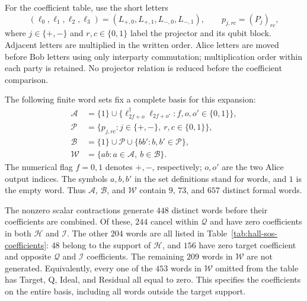 For the coefficient table, use the short letters
\begin{equation*}
 (\ell_0,\ell_1,\ell_2,\ell_3)
 =(L_{+,0},L_{+,1},L_{-,0},L_{-,1}),
 \qquad p_{j,rc}=(P_j)_{rc},
\end{equation*}
where $j\in\{+,-\}$ and $r,c\in\{0,1\}$ label the projector and its qubit block.
Adjacent letters are multiplied in the written order. Alice letters are moved
before Bob letters using only interparty commutation; multiplication order
within each party is retained. No projector relation is reduced before the
coefficient comparison.

The following finite word sets fix a complete basis for this expansion:
\begin{align*}
 \mathcal A&=\{1\}\cup
 \{\ell_{2f+o}^{\dagger}\ell_{2f+o'}:
           f,o,o'\in\{0,1\}\},\\
 \mathcal P&=\{p_{j,rc}:j\in\{+,-\},\ r,c\in\{0,1\}\},\\
 \mathcal B&=\{1\}\cup\mathcal P
                    \cup\{bb':b,b'\in\mathcal P\},\\
 \mathcal W&=\{ab:a\in\mathcal A,\ b\in\mathcal B\}.
\end{align*}
The numerical flag $f=0,1$ denotes $+,-$, respectively; $o,o'$ are the two
Alice output indices. The symbols $a,b,b'$ in the set definitions stand for
words, and $1$ is the empty word. Thus $\mathcal A$, $\mathcal B$, and
$\mathcal W$ contain $9$, $73$, and $657$ distinct formal words.

The nonzero scalar contractions generate $448$ distinct words before their
coefficients are combined. Of these, $244$ cancel within $\mathcal Q$ and
have zero coefficients in both $\mathcal H$ and $\mathcal I$. The other
$204$ words are all listed in Table~\ref{tab:hall-sos-coefficients}: $48$
belong to the support of $\mathcal H$, and $156$ have zero target coefficient
and opposite $\mathcal Q$ and $\mathcal I$ coefficients. The remaining $209$
words in $\mathcal W$ are not generated. Equivalently, every one of the
$453$ words in $\mathcal W$ omitted from the table has Target, Q, Ideal,
and Residual all equal to zero. This specifies the coefficients on the
entire basis, including all words outside the target support.

